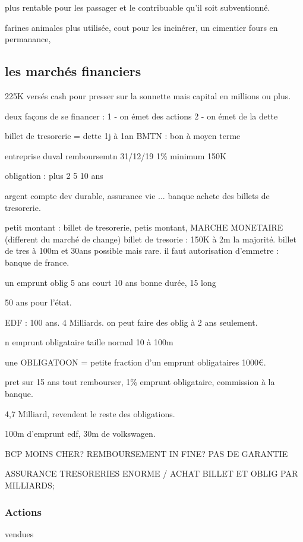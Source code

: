 \documentclass[a4paper,12pt]{article}
\begin{document}
plus rentable pour les passager et le contribuable qu'il soit subventionné.



farines animales plus utilisée, cout pour les incinérer, un cimentier fours en permanance,


\subsection{les marchés financiers} 

225K versés cash pour presser sur la sonnette mais capital en millions ou plus.

deux façons de se financer :
 1 - on émet des actions 
 2 - on émet de la dette
 
 billet de tresorerie = dette 1j à 1an
 BMTN : bon à moyen terme
 
 entreprise duval remboursemtn 31/12/19 1\% minimum 150K
 
 
 obligation : plus 2 5  10 ans
%

argent compte dev durable, assurance vie ... banque achete des billets de tresorerie.

petit montant : billet de tresorerie, petis montant,  MARCHE MONETAIRE  (different du marché de change)
billet de tresorie : 150K à 2m la majorité.
billet de tres à 100m et 30ans possible mais rare.
il faut autorisation d'emmetre : banque de france.

un emprunt oblig 5 ans court
10 ans bonne durée, 15 long

50 ans pour l'état.

EDF : 100 ans. 4 Milliards.
on peut faire des oblig à 2 ans seulement.

n emprunt obligataire taille normal 10 à 100m

une OBLIGATOON = petite fraction d'un emprunt obligataires  1000€.

pret sur 15 ans tout rembourser, 1\% emprunt obligataire, commission à la banque.


4,7 Milliard, revendent le reste des obligations.

100m d'emprunt edf, 30m de volkswagen.

BCP MOINS CHER? REMBOURSEMENT IN FINE? PAS DE GARANTIE

ASSURANCE TRESORERIES ENORME / ACHAT BILLET ET OBLIG PAR MILLIARDS;



\subsubsection{Actions}
vendues 
\end{document}
